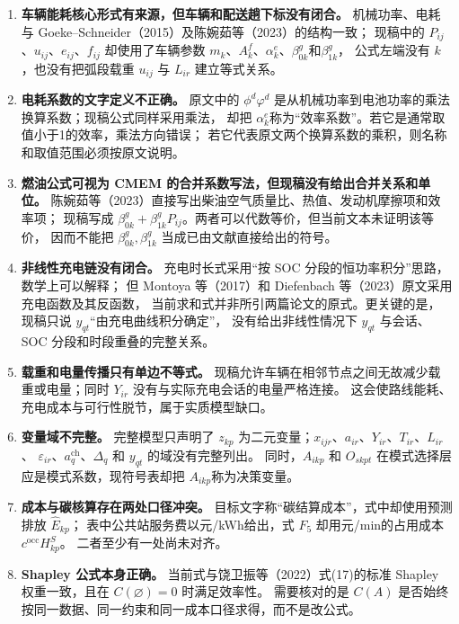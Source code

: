 \documentclass[UTF8,11pt,a4paper,fontset=none]{ctexart}
\begin{document}
\begin{enumerate}[leftmargin=2.4em]
  \item \textbf{车辆能耗核心形式有来源，但车辆和配送趟下标没有闭合。}
  机械功率、电耗与 Goeke--Schneider（2015）及陈婉茹等（2023）的结构一致；
  现稿中的 $P_{ij}$、$u_{ij}$、$e_{ij}$、$f_{ij}$ 却使用了车辆参数
  $m_k$、$A_k^f$、$\alpha_k^e$、$\beta_{0k}^g$和$\beta_{1k}^g$，
  公式左端没有 $k$，也没有把弧段载重 $u_{ij}$ 与 $L_{ir}$ 建立等式关系。

  \item \textbf{电耗系数的文字定义不正确。}
  原文中的 $\phi^d\varphi^d$ 是从机械功率到电池功率的乘法换算系数；现稿公式同样采用乘法，
  却把 $\alpha_k^e$称为“效率系数”。若它是通常取值小于1的效率，乘法方向错误；
  若它代表原文两个换算系数的乘积，则名称和取值范围必须按原文说明。

  \item \textbf{燃油公式可视为 CMEM 的合并系数写法，但现稿没有给出合并关系和单位。}
  陈婉茹等（2023）直接写出柴油空气质量比、热值、发动机摩擦项和效率项；
  现稿写成 $\beta_{0k}^g+\beta_{1k}^gP_{ij}$。两者可以代数等价，但当前文本未证明该等价，
  因而不能把 $\beta_{0k}^g,\beta_{1k}^g$ 当成已由文献直接给出的符号。

  \item \textbf{非线性充电链没有闭合。}
  充电时长式采用“按 SOC 分段的恒功率积分”思路，数学上可以解释；
  但 Montoya 等（2017）和 Diefenbach 等（2023）原文采用充电函数及其反函数，
  当前求和式并非所引两篇论文的原式。更关键的是，现稿只说 $y_{qt}$“由充电曲线积分确定”，
  没有给出非线性情况下 $y_{qt}$ 与会话、SOC 分段和时段重叠的完整关系。

  \item \textbf{载重和电量传播只有单边不等式。}
  现稿允许车辆在相邻节点之间无故减少载重或电量；同时 $Y_{ir}$ 没有与实际充电会话的电量严格连接。
  这会使路线能耗、充电成本与可行性脱节，属于实质模型缺口。

  \item \textbf{变量域不完整。}
  完整模型只声明了 $z_{kp}$ 为二元变量；$x_{ijr}$、$a_{ir}$、$Y_{ir}$、$T_{ir}$、$L_{ir}$、
  $\varepsilon_{ir}$、$a_q^{\mathrm{ch}}$、$\Delta_q$ 和 $y_{qt}$ 的域没有完整列出。
  同时，$A_{ikp}$ 和 $O_{skpt}$ 在模式选择层应是模式系数，现符号表却把 $A_{ikp}$称为决策变量。

  \item \textbf{成本与碳核算存在两处口径冲突。}
  目标文字称“碳结算成本”，式中却使用预测排放 $\widehat E_{kp}$；
  表中公共站服务费以元/kWh给出，式 $F_5$ 却用元/min的占用成本 $c^{\mathrm{occ}}H_{kp}^{S}$。
  二者至少有一处尚未对齐。

  \item \textbf{Shapley 公式本身正确。}
  当前式与饶卫振等（2022）式(17)的标准 Shapley 权重一致，且在 $C(\varnothing)=0$ 时满足效率性。
  需要核对的是 $C(A)$ 是否始终按同一数据、同一约束和同一成本口径求得，而不是改公式。
\end{enumerate}
\end{document}
